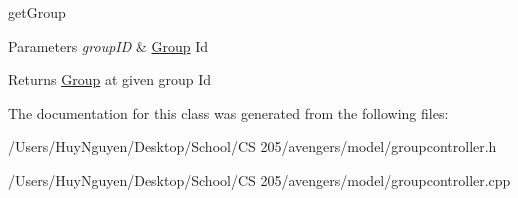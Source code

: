 get\+Group 


\begin{DoxyParams}{Parameters}
{\em group\+ID} & \hyperlink{classGroup}{Group} Id \\
\hline
\end{DoxyParams}
\begin{DoxyReturn}{Returns}
\hyperlink{classGroup}{Group} at given group Id 
\end{DoxyReturn}


The documentation for this class was generated from the following files\+:\begin{DoxyCompactItemize}
\item 
/\+Users/\+Huy\+Nguyen/\+Desktop/\+School/\+C\+S 205/avengers/model/groupcontroller.\+h\item 
/\+Users/\+Huy\+Nguyen/\+Desktop/\+School/\+C\+S 205/avengers/model/groupcontroller.\+cpp\end{DoxyCompactItemize}
